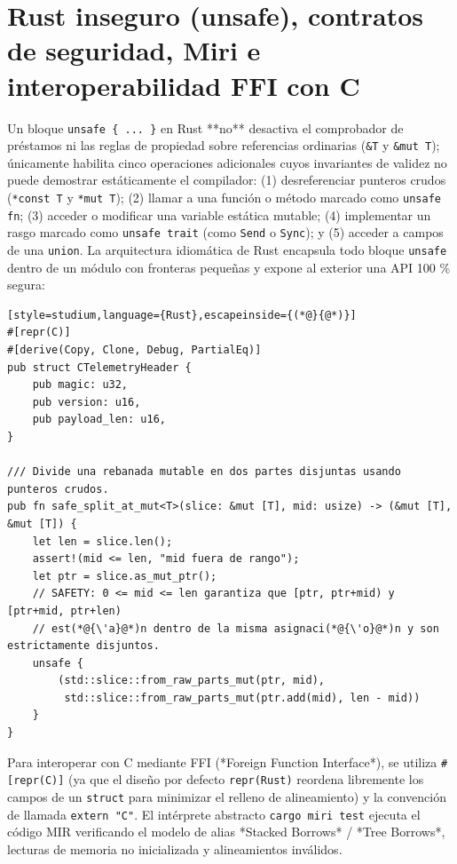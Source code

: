 \documentclass{book}
\begin{document}
\section{Rust inseguro (unsafe), contratos de seguridad, Miri e interoperabilidad FFI con C}

Un bloque \texttt{unsafe \{ ... \}} en Rust **no** desactiva el comprobador de préstamos ni las reglas de propiedad sobre referencias ordinarias (\texttt{\&T} y \texttt{\&mut T}); únicamente habilita cinco operaciones adicionales cuyos invariantes de validez no puede demostrar estáticamente el compilador: (1) desreferenciar punteros crudos (\texttt{*const T} y \texttt{*mut T}); (2) llamar a una función o método marcado como \texttt{unsafe fn}; (3) acceder o modificar una variable estática mutable; (4) implementar un rasgo marcado como \texttt{unsafe trait} (como \texttt{Send} o \texttt{Sync}); y (5) acceder a campos de una \texttt{union}. La arquitectura idiomática de Rust encapsula todo bloque \texttt{unsafe} dentro de un módulo con fronteras pequeñas y expone al exterior una API 100 \% segura:
\begin{lstlisting}[style=studium,language={Rust},escapeinside={(*@}{@*)}]
#[repr(C)]
#[derive(Copy, Clone, Debug, PartialEq)]
pub struct CTelemetryHeader {
    pub magic: u32,
    pub version: u16,
    pub payload_len: u16,
}

/// Divide una rebanada mutable en dos partes disjuntas usando punteros crudos.
pub fn safe_split_at_mut<T>(slice: &mut [T], mid: usize) -> (&mut [T], &mut [T]) {
    let len = slice.len();
    assert!(mid <= len, "mid fuera de rango");
    let ptr = slice.as_mut_ptr();
    // SAFETY: 0 <= mid <= len garantiza que [ptr, ptr+mid) y [ptr+mid, ptr+len)
    // est(*@{\'a}@*)n dentro de la misma asignaci(*@{\'o}@*)n y son estrictamente disjuntos.
    unsafe {
        (std::slice::from_raw_parts_mut(ptr, mid),
         std::slice::from_raw_parts_mut(ptr.add(mid), len - mid))
    }
}
\end{lstlisting}
Para interoperar con C mediante FFI (*Foreign Function Interface*), se utiliza \texttt{\#[repr(C)]} (ya que el diseño por defecto \texttt{repr(Rust)} reordena libremente los campos de un \texttt{struct} para minimizar el relleno de alineamiento) y la convención de llamada \texttt{extern "C"}. El intérprete abstracto \texttt{cargo miri test} ejecuta el código MIR verificando el modelo de alias *Stacked Borrows* / *Tree Borrows*, lecturas de memoria no inicializada y alineamientos inválidos.
\end{document}
